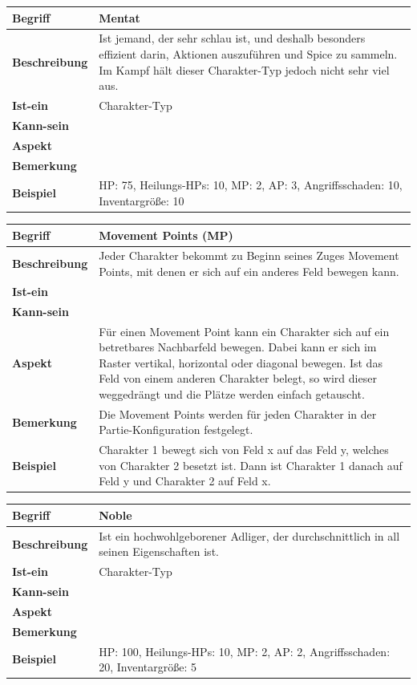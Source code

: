 \documentclass{uulm-assignment}
\newcounter{fa}
\newcounter{nfa}
\begin{document}
\begin{tabularx}{16cm}{|l|X|}
\hline
\textbf{Begriff} & \textbf{Mentat} \\
\hline
\textbf{Beschreibung} & Ist jemand, der sehr schlau ist, und deshalb besonders effizient darin, Aktionen auszuführen und Spice zu sammeln. Im Kampf hält dieser Charakter-Typ jedoch nicht sehr viel aus. \\
\hline
\textbf{Ist-ein} & Charakter-Typ\\
\hline
\textbf{Kann-sein} & \\
\hline
\textbf{Aspekt} & \\
\hline
\textbf{Bemerkung} &  \\
\hline
\textbf{Beispiel} & HP: 75, Heilungs-HPs: 10, MP: 2, AP: 3, Angriffsschaden: 10, Inventargröße: 10 \\
\hline
\end{tabularx}

\begin{tabularx}{16cm}{|l|X|}
\hline
\textbf{Begriff} & \textbf{Movement Points (MP)} \\
\hline
\textbf{Beschreibung} & Jeder Charakter bekommt zu Beginn seines Zuges Movement Points, mit denen er sich auf ein anderes Feld bewegen kann. \\
\hline
\textbf{Ist-ein} & \\
\hline
\textbf{Kann-sein} & \\
\hline
\textbf{Aspekt} & Für einen Movement Point kann ein Charakter sich auf ein betretbares Nachbarfeld bewegen. Dabei kann er sich im Raster vertikal, horizontal oder diagonal bewegen. Ist das Feld von einem anderen Charakter belegt, so wird dieser weggedrängt und die Plätze werden einfach getauscht.\\
\hline
\textbf{Bemerkung} & Die Movement Points werden für jeden Charakter in der Partie-Konfiguration festgelegt. \\
\hline
\textbf{Beispiel} & Charakter 1 bewegt sich von Feld x auf das Feld y, welches von Charakter 2 besetzt ist. Dann ist Charakter 1 danach auf Feld y und Charakter 2 auf Feld x. \\
\hline
\end{tabularx}

\begin{tabularx}{16cm}{|l|X|}
\hline
\textbf{Begriff} & \textbf{Noble} \\
\hline
\textbf{Beschreibung} & Ist ein hochwohlgeborener Adliger, der durchschnittlich in all seinen Eigenschaften ist.\\
\hline
\textbf{Ist-ein} & Charakter-Typ\\
\hline
\textbf{Kann-sein} & \\
\hline
\textbf{Aspekt} & \\
\hline
\textbf{Bemerkung} &  \\
\hline
\textbf{Beispiel} & HP: 100, Heilungs-HPs: 10, MP: 2, AP: 2, Angriffsschaden: 20, Inventargröße: 5 \\
\hline
\end{tabularx}
\end{document}
